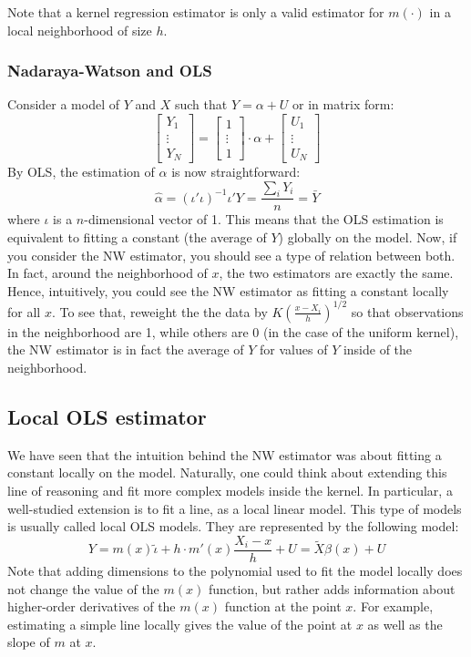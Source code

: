 Note that a kernel regression estimator is only a valid estimator for $m(\cdot)$ in a local neighborhood of size $h$.

\subsubsection{Nadaraya-Watson and OLS}

Consider a model of $Y$ and $X$ such that $Y = \alpha + U$ or in matrix form: $$\begin{bmatrix}
Y_1 \\ \vdots \\ Y_N
\end{bmatrix} = \begin{bmatrix}
1 \\ \vdots \\ 1
\end{bmatrix}\cdot \alpha + \begin{bmatrix}
U_1 \\ \vdots \\ U_N
\end{bmatrix} $$ By OLS, the estimation of $\alpha$ is now straightforward: $$\hat\alpha = (\iota' \iota)^{-1} \iota' Y = \frac{\sum_i Y_i}{n} = \bar Y$$ where $\iota$ is a $n$-dimensional vector of 1. This means that the OLS estimation is equivalent to fitting a constant (the average of $Y$) globally on the model. Now, if you consider the NW estimator, you should see a type of relation between both. In fact, around the neighborhood of $x$, the two estimators are exactly the same. Hence, intuitively, you could see the NW estimator as fitting a constant locally for all $x$. To see that, reweight the the data by $K\left(\frac{x - X_i}{h}\right)^{1/2}$ so that observations in the neighborhood are 1, while others are 0 (in the case of the uniform kernel), the NW estimator is in fact the average of $Y$ for values of $Y$ inside of the neighborhood.

\subsection{Local OLS estimator}

We have seen that the intuition behind the NW estimator was about fitting a constant locally on the model. Naturally, one could think about extending this line of reasoning and fit more complex models inside the kernel. In particular, a well-studied extension is to fit a line, as a local linear model. This type of models is usually called local OLS models. They are represented by the following model: $$Y = m(x)\tilde\iota + h\cdot m'(x)\frac{X_i - x}{h} + U = \tilde X\beta (x) + U $$ Note that adding dimensions to the polynomial used to fit the model locally does not change the value of the $m(x)$ function, but rather adds information about higher-order derivatives of the $m(x)$ function at the point $x$. For example, estimating a simple line locally gives the value of the point at $x$ as well as the slope of $m$ at $x$.

